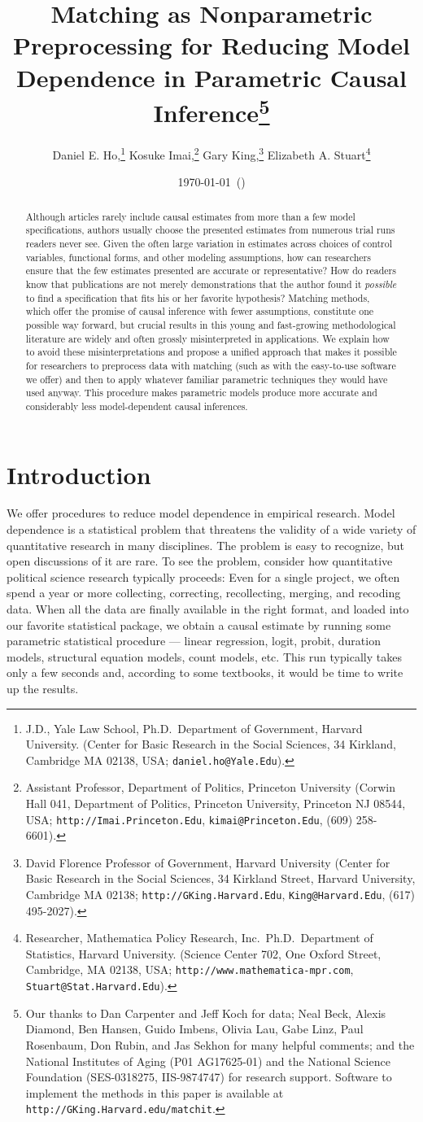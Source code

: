 \documentclass[11pt,titlepage]{article}
\title{Matching as Nonparametric Preprocessing for Reducing Model
  Dependence in Parametric Causal Inference\thanks{Our thanks to Dan
    Carpenter and Jeff Koch for data; Neal Beck, Alexis Diamond, Ben
    Hansen, Guido Imbens, Olivia Lau, Gabe Linz, Paul Rosenbaum, Don
    Rubin, and Jas Sekhon for many helpful comments; and the National
    Institutes of Aging (P01 AG17625-01) and the National Science
    Foundation (SES-0318275, IIS-9874747) for research support.
    Software to implement the methods in this paper is available at
    \texttt{http://GKing.Harvard.edu/matchit}.}}
\author{Daniel E. Ho,\thanks{J.D., Yale Law School, Ph.D.\,
    Department of Government, Harvard University. (Center for Basic
    Research in the Social Sciences, 34 Kirkland, Cambridge MA 02138,
    USA; \texttt{daniel.ho@Yale.Edu}).}
  Kosuke Imai,\thanks{Assistant Professor, Department of Politics,
    Princeton University (Corwin Hall 041, Department of Politics,
    Princeton University, Princeton NJ 08544, USA;
    \texttt{http://Imai.Princeton.Edu}, \texttt{kimai@Princeton.Edu},
    (609) 258-6601).}
  Gary King,\thanks{David Florence Professor of Government, Harvard
    University (Center for Basic Research in the Social Sciences, 34
    Kirkland Street, Harvard University, Cambridge MA 02138;
    \texttt{http://GKing.Harvard.Edu}, \texttt{King@Harvard.Edu},
    (617) 495-2027).}
Elizabeth A. Stuart\thanks{Researcher, Mathematica Policy Research,
  Inc.\, Ph.D.\, Department of Statistics, Harvard University.
  (Science Center 702, One Oxford Street, Cambridge, MA 02138, USA;
  \texttt{http://www.mathematica-mpr.com},
  \texttt{Stuart@Stat.Harvard.Edu}).}}
\date{\today\ (\printtime)}
\begin{document}
\maketitle

\begin{abstract}
  Although articles rarely include causal estimates from more than a
  few model specifications, authors usually choose the presented
  estimates from numerous trial runs readers never see.  Given the
  often large variation in estimates across choices of control
  variables, functional forms, and other modeling assumptions, how can
  researchers ensure that the few estimates presented are accurate or
  representative?  How do readers know that publications are not
  merely demonstrations that the author found it \emph{possible} to
  find a specification that fits his or her favorite hypothesis?
  Matching methods, which offer the promise of causal inference with
  fewer assumptions, constitute one possible way forward, but crucial
  results in this young and fast-growing methodological literature are
  widely and often grossly misinterpreted in applications.  We explain
  how to avoid these misinterpretations and propose a unified approach
  that makes it possible for researchers to preprocess data with
  matching (such as with the easy-to-use software we offer) and then
  to apply whatever familiar parametric techniques they would have
  used anyway.  This procedure makes parametric models produce more
  accurate and considerably less model-dependent causal inferences.
\end{abstract}

\section{Introduction}

We offer procedures to reduce model dependence in empirical research.
Model dependence is a statistical problem that threatens the validity
of a wide variety of quantitative research in many disciplines.  The
problem is easy to recognize, but open discussions of it are rare.  To
see the problem, consider how quantitative political science research
typically proceeds: Even for a single project, we often spend a year
or more collecting, correcting, recollecting, merging, and recoding
data.  When all the data are finally available in the right format,
and loaded into our favorite statistical package, we obtain a causal
estimate by running some parametric statistical procedure --- linear
regression, logit, probit, duration models, structural equation
models, count models, etc.  This run typically takes only a few
seconds and, according to some textbooks, it would be time to write up
the results.
\end{document}
